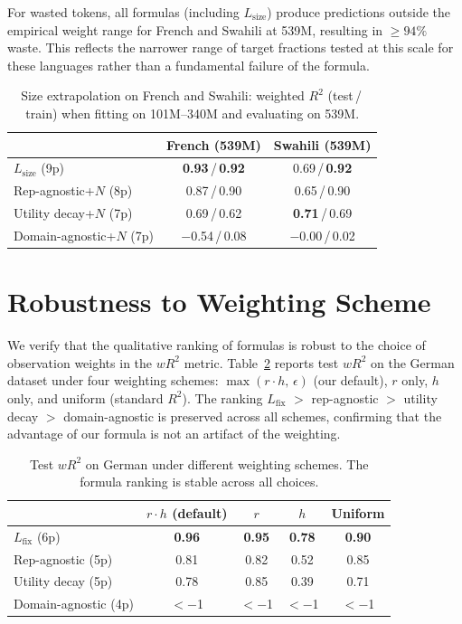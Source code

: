 For wasted tokens, all formulas (including $L_\mathrm{size}$) produce predictions outside the empirical weight range for French and Swahili at 539M, resulting in ${\geq}94\%$ waste.
This reflects the narrower range of target fractions tested at this scale for these languages rather than a fundamental failure of the formula.

\begin{table}[h!]
\centering
\caption{Size extrapolation on French and Swahili: weighted $R^2$ (test\,/\,train) when fitting on 101M--340M and evaluating on 539M.}
\label{tab:size_extrap_app}
\begin{tabular}{lcc}
\toprule
& French (539M) & Swahili (539M) \\
\midrule
$L_\mathrm{size}$ (9p) & \textbf{0.93}\,/\,\textbf{0.92} & 0.69\,/\,\textbf{0.92} \\
Rep-agnostic+$N$ (8p) & 0.87\,/\,0.90 & 0.65\,/\,0.90 \\
Utility decay+$N$ (7p) & 0.69\,/\,0.62 & \textbf{0.71}\,/\,0.69 \\
Domain-agnostic+$N$ (7p) & $-$0.54\,/\,0.08 & $-$0.00\,/\,0.02 \\
\bottomrule
\end{tabular}
\end{table}


\section{Robustness to Weighting Scheme}
\label{app:weighting}

We verify that the qualitative ranking of formulas is robust to the choice of observation weights in the $wR^2$ metric.
Table~\ref{tab:weighting_robustness} reports test $wR^2$ on the German dataset under four weighting schemes: $\max(r \cdot h,\,\epsilon)$ (our default), $r$ only, $h$ only, and uniform (standard $R^2$).
The ranking $L_\mathrm{fix}$ $>$ rep-agnostic $>$ utility decay $>$ domain-agnostic is preserved across all schemes, confirming that the advantage of our formula is not an artifact of the weighting.
\begin{table}[h!]
\centering
\caption{Test $wR^2$ on German under different weighting schemes. The formula ranking is stable across all choices.}
\label{tab:weighting_robustness}
\begin{tabular}{lcccc}
\toprule
& $r \cdot h$ (default) & $r$ & $h$ & Uniform \\
\midrule
$L_\mathrm{fix}$ (6p) & \textbf{0.96} & \textbf{0.95} & \textbf{0.78} & \textbf{0.90} \\
Rep-agnostic (5p) & 0.81 & 0.82 & 0.52 & 0.85 \\
Utility decay (5p) & 0.78 & 0.85 & 0.39 & 0.71 \\
Domain-agnostic (4p) & $<$$-$1 & $<$$-$1 & $<$$-$1 & $<$$-$1 \\
\bottomrule
\end{tabular}
\end{table}


